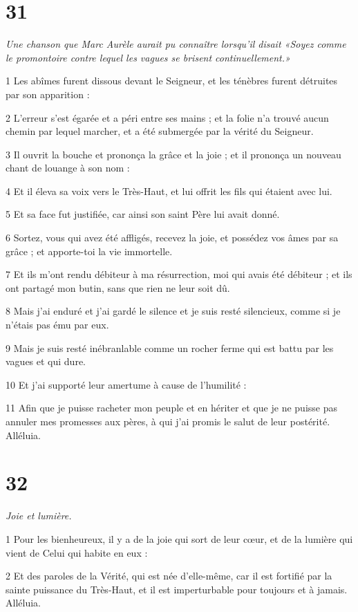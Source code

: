\chapter{31}

\par \textit{Une chanson que Marc Aurèle aurait pu connaître lorsqu'il disait «Soyez comme le promontoire contre lequel les vagues se brisent continuellement.»}

\par 1 Les abîmes furent dissous devant le Seigneur, et les ténèbres furent détruites par son apparition :
\par 2 L'erreur s'est égarée et a péri entre ses mains ; et la folie n'a trouvé aucun chemin par lequel marcher, et a été submergée par la vérité du Seigneur.
\par 3 Il ouvrit la bouche et prononça la grâce et la joie ; et il prononça un nouveau chant de louange à son nom :
\par 4 Et il éleva sa voix vers le Très-Haut, et lui offrit les fils qui étaient avec lui.
\par 5 Et sa face fut justifiée, car ainsi son saint Père lui avait donné.
\par 6 Sortez, vous qui avez été affligés, recevez la joie, et possédez vos âmes par sa grâce ; et apporte-toi la vie immortelle.
\par 7 Et ils m'ont rendu débiteur à ma résurrection, moi qui avais été débiteur ; et ils ont partagé mon butin, sans que rien ne leur soit dû.
\par 8 Mais j'ai enduré et j'ai gardé le silence et je suis resté silencieux, comme si je n'étais pas ému par eux.
\par 9 Mais je suis resté inébranlable comme un rocher ferme qui est battu par les vagues et qui dure.
\par 10 Et j'ai supporté leur amertume à cause de l'humilité :
\par 11 Afin que je puisse racheter mon peuple et en hériter et que je ne puisse pas annuler mes promesses aux pères, à qui j'ai promis le salut de leur postérité. Alléluia.

\chapter{32}

\par \textit{Joie et lumière.}

\par 1 Pour les bienheureux, il y a de la joie qui sort de leur cœur, et de la lumière qui vient de Celui qui habite en eux :
\par 2 Et des paroles de la Vérité, qui est née d'elle-même, car il est fortifié par la sainte puissance du Très-Haut, et il est imperturbable pour toujours et à jamais. Alléluia.


